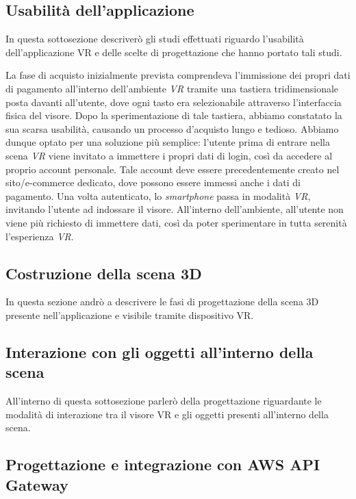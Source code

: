 \subsection{Usabilità dell'applicazione}

In questa sottosezione descriverò gli studi effettuati riguardo l'usabilità dell'applicazione VR e delle scelte di progettazione che hanno portato tali studi.

La fase di acquisto inizialmente prevista comprendeva l'immissione dei propri dati di pagamento all'interno dell'ambiente \textit{VR} tramite una tastiera tridimensionale posta davanti all'utente, dove ogni tasto era selezionabile attraverso l'interfaccia fisica del visore. Dopo la sperimentazione di tale tastiera, abbiamo constatato la sua scarsa usabilità, causando un processo d'acquisto lungo e tedioso. Abbiamo dunque optato per una soluzione più semplice: l'utente prima di entrare nella scena \textit{VR} viene invitato a immettere i propri dati di login, così da accedere al proprio account personale. Tale account deve essere precedentemente creato nel sito/e-commerce dedicato, dove possono essere immessi anche i dati di pagamento. Una volta autenticato, lo \textit{smartphone} passa in modalità \textit{VR}, invitando l'utente ad indossare il visore. All'interno dell'ambiente, all'utente non viene più richiesto di immettere dati, così da poter sperimentare in tutta serenità l'esperienza \textit{VR}.

\subsection{Costruzione della scena 3D}

In questa sezione andrò a descrivere le fasi di progettazione della scena 3D presente nell'applicazione e visibile tramite dispositivo VR.

\subsection{Interazione con gli oggetti all'interno della scena} 

All'interno di questa sottosezione parlerò della progettazione riguardante le modalità di interazione tra il visore VR e gli oggetti presenti all'interno della scena.

\subsection{Progettazione e integrazione con AWS API Gateway}

